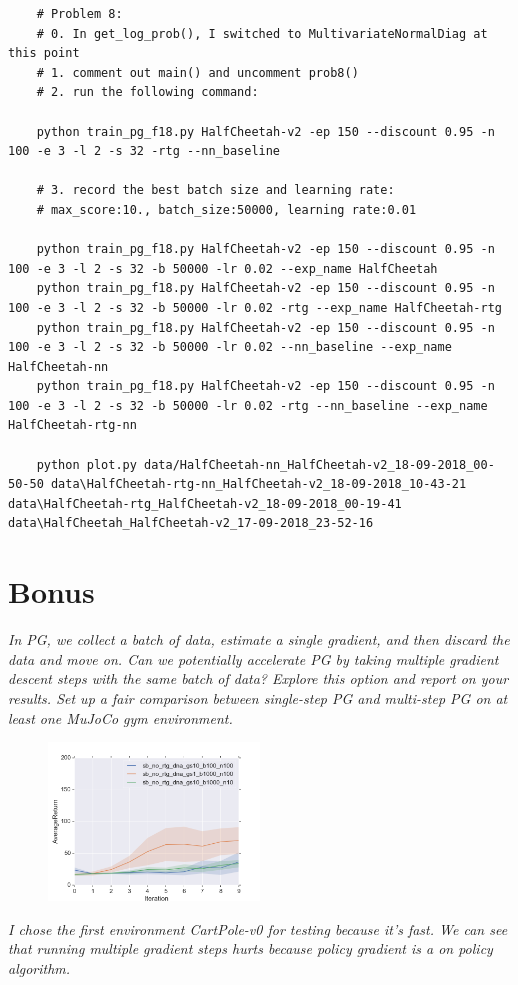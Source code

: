 \documentclass[12pt]{article}
\begin{document}
	\begin{minipage}{\linewidth}
	\begin{lstlisting}
	# Problem 8:
	# 0. In get_log_prob(), I switched to MultivariateNormalDiag at this point
	# 1. comment out main() and uncomment prob8()
	# 2. run the following command:
	
	python train_pg_f18.py HalfCheetah-v2 -ep 150 --discount 0.95 -n 100 -e 3 -l 2 -s 32 -rtg --nn_baseline
	
	# 3. record the best batch size and learning rate:
	# max_score:10., batch_size:50000, learning rate:0.01
	
	python train_pg_f18.py HalfCheetah-v2 -ep 150 --discount 0.95 -n 100 -e 3 -l 2 -s 32 -b 50000 -lr 0.02 --exp_name HalfCheetah
	python train_pg_f18.py HalfCheetah-v2 -ep 150 --discount 0.95 -n 100 -e 3 -l 2 -s 32 -b 50000 -lr 0.02 -rtg --exp_name HalfCheetah-rtg
	python train_pg_f18.py HalfCheetah-v2 -ep 150 --discount 0.95 -n 100 -e 3 -l 2 -s 32 -b 50000 -lr 0.02 --nn_baseline --exp_name HalfCheetah-nn
	python train_pg_f18.py HalfCheetah-v2 -ep 150 --discount 0.95 -n 100 -e 3 -l 2 -s 32 -b 50000 -lr 0.02 -rtg --nn_baseline --exp_name HalfCheetah-rtg-nn
	
	python plot.py data/HalfCheetah-nn_HalfCheetah-v2_18-09-2018_00-50-50 data\HalfCheetah-rtg-nn_HalfCheetah-v2_18-09-2018_10-43-21 data\HalfCheetah-rtg_HalfCheetah-v2_18-09-2018_00-19-41 data\HalfCheetah_HalfCheetah-v2_17-09-2018_23-52-16
	\end{lstlisting}
	\end{minipage}
	
	\section*{Bonus}
	
	\par\itshape
	In PG, we collect a batch of data, estimate a single gradient, and then discard the data and move on. Can we potentially accelerate PG by taking multiple gradient descent steps with the same batch of data? Explore this option and report on your results. Set up a fair comparison between single-step PG and multi-step PG on at least one MuJoCo gym environment.
	\par
	
	\begin{figure}[!htbp]
		\includegraphics[width=0.5\textwidth]{bonus.png}
	\end{figure}
	\itshape
	\normalfont
	I chose the first environment CartPole-v0 for testing because it's fast. We can see that running multiple gradient steps hurts because policy gradient is a on policy algorithm.
	
\end{document}
